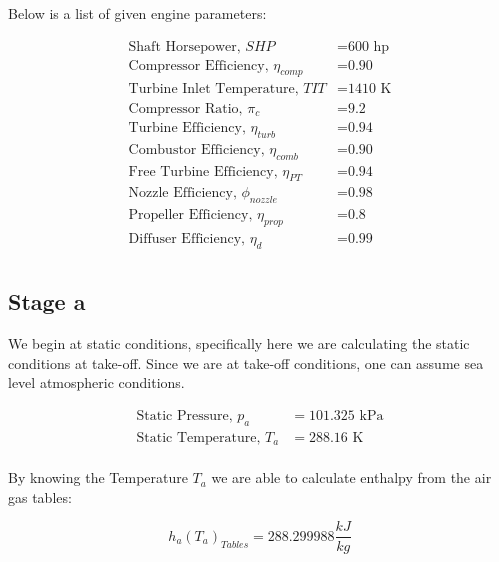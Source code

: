\documentclass[titlepage]{article}
\begin{document}
    Below is a list of given engine parameters:

    \begin{equation}
        \begin{aligned}
            \text{Shaft Horsepower, $SHP$} &= \text{600 hp} \\
            \text{Compressor Efficiency, $\eta_{comp}$} &= \text{0.90} \\
            \text{Turbine Inlet Temperature, $TIT$} &= \text{1410 K} \\
            \text{Compressor Ratio, $\pi_{c}$} &= \text{9.2} \\
            \text{Turbine Efficiency, $\eta_{turb}$} &= \text{0.94} \\
            \text{Combustor Efficiency, $\eta_{comb}$} &= \text{0.90} \\
            \text{Free Turbine Efficiency, $\eta_{PT}$} &= \text{0.94} \\
            \text{Nozzle Efficiency, $\phi_{nozzle}$} &= \text{0.98} \\
            \text{Propeller Efficiency, $\eta_{prop}$} &= \text{0.8} \\
            \text{Diffuser Efficiency, $\eta_{d}$} &= \text{0.99} \\
        \end{aligned}
    \end{equation}

    \subsection{Stage a}

    We begin at static conditions, specifically here we are calculating the static conditions at take-off. Since we are at take-off conditions, one can assume sea level atmospheric conditions.

    \begin{equation}
        \begin{aligned}
            \text{Static Pressure, $p_{a}$} &= 101.325 \text{ kPa} \\
            \text{Static Temperature, $T_{a}$} &= 288.16 \text{ K} \\
        \end{aligned}
    \end{equation}

    By knowing the Temperature $T_{a}$ we are able to calculate enthalpy from the air gas tables:

    \begin{equation}
        h_{a}(T_{a})_{Tables} = 288.299988 \frac{kJ}{kg}
    \end{equation}
\end{document}
